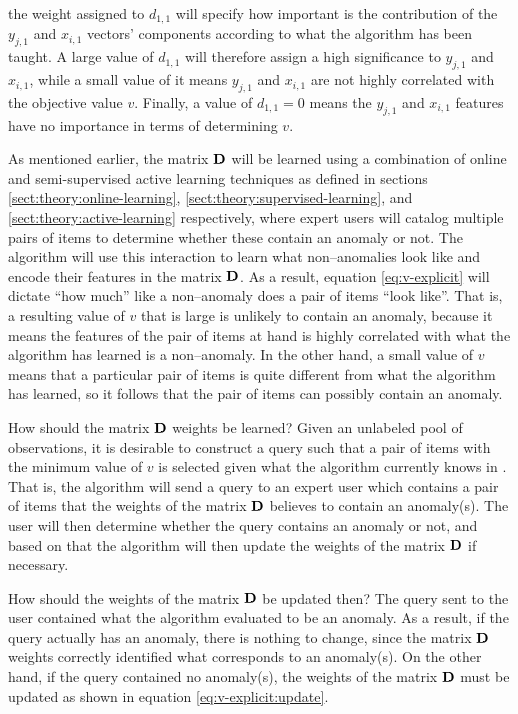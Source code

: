 the weight assigned to $d_{1,1}$ will specify how important is the contribution of the $y_{j,1}$ and $x_{i,1}$ vectors' components according to what the \mlblink algorithm has been taught. A large value of $d_{1,1}$ will therefore assign a high significance to $y_{j,1}$ and $x_{i,1}$, while a small value of it means $y_{j,1}$ and $x_{i,1}$ are not highly correlated with the objective value $v$. Finally, a value of $d_{1,1} = 0$ means the $y_{j,1}$ and $x_{i,1}$ features have no importance in terms of determining $v$.  \newline

As mentioned earlier, the matrix $\boldsymbol{\mathbf{D}}$ will be learned using a combination of online and semi-supervised active learning techniques as defined in sections \ref{sect:theory:online-learning}, \ref{sect:theory:supervised-learning}, and \ref{sect:theory:active-learning} respectively, where expert users will catalog multiple pairs of items to determine whether these contain an anomaly or not. The \mlblink algorithm will use this interaction to learn what non--anomalies look like and encode their features in the matrix $\boldsymbol{\mathbf{D}}$. As a result, equation \ref{eq:v-explicit} will dictate ``how much'' like a non--anomaly does a pair of items ``look like''. That is, a resulting value of $v$ that is large is unlikely to contain an anomaly, because it means the features of the pair of items at hand is highly correlated with what the \mlblink algorithm has learned is a non--anomaly. In the other hand, a small value of $v$ means that a particular pair of items is quite different from what the \mlblink algorithm has learned, so it follows that the pair of items can possibly contain an anomaly.  \newline

How should the matrix $\boldsymbol{\mathbf{D}}$ weights be learned? Given an unlabeled pool of observations, it is desirable to construct a query such that a pair of items with the minimum value of $v$ is selected given what the \mlblink algorithm currently knows in . That is, the \mlblink algorithm will send a query to an expert user which contains a pair of items that the weights of the matrix $\boldsymbol{\mathbf{D}}$ believes to contain an anomaly(s). The user will then determine whether the query contains an anomaly or not, and based on that the \mlblink algorithm will then update the weights of the matrix $\boldsymbol{\mathbf{D}}$ if necessary.  \newline

How should the weights of the matrix $\boldsymbol{\mathbf{D}}$ be updated then? The query sent to the user contained what the \mlblink algorithm evaluated to be an anomaly. As a result, if the query actually has an anomaly, there is nothing to change, since the matrix $\boldsymbol{\mathbf{D}}$ weights correctly identified what corresponds to an anomaly(s). On the other hand, if the query contained no anomaly(s), the weights of the matrix $\boldsymbol{\mathbf{D}}$ must be updated as shown in equation \ref{eq:v-explicit:update}.

